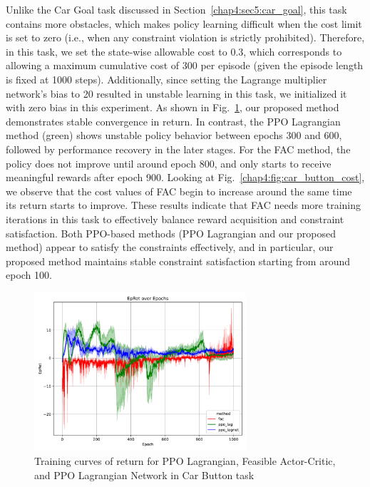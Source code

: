 Unlike the Car Goal task discussed in Section~\ref{chap4:sec5:car_goal}, this task contains more obstacles, which makes policy learning difficult when the cost limit is set to zero (i.e., when any constraint violation is strictly prohibited).
Therefore, in this task, we set the state-wise allowable cost to 0.3, which corresponds to allowing a maximum cumulative cost of 300 per episode (given the episode length is fixed at 1000 steps).
Additionally, since setting the Lagrange multiplier network’s bias to 20 resulted in unstable learning in this task, we initialized it with zero bias in this experiment.
As shown in Fig.~\ref{chap4:fig:car_button_return}, our proposed method demonstrates stable convergence in return.
In contrast, the PPO Lagrangian method (green) shows unstable policy behavior between epochs 300 and 600, followed by performance recovery in the later stages.
For the FAC method, the policy does not improve until around epoch 800, and only starts to receive meaningful rewards after epoch 900.
Looking at Fig.~\ref{chap4:fig:car_button_cost}, we observe that the cost values of FAC begin to increase around the same time its return starts to improve.
These results indicate that FAC needs more training iterations in this task to effectively balance reward acquisition and constraint satisfaction.
Both PPO-based methods (PPO Lagrangian and our proposed method) appear to satisfy the constraints effectively, and in particular, our proposed method maintains stable constraint satisfaction starting from around epoch 100.

\begin{figure}[h]
  \centering
  \includegraphics[width=0.7\textwidth]{imgs/chap4/car_button/return.pdf}
  \caption{Training curves of return for PPO Lagrangian, Feasible Actor-Critic, and PPO Lagrangian Network in Car Button task}
  \label{chap4:fig:car_button_return}
\end{figure}

